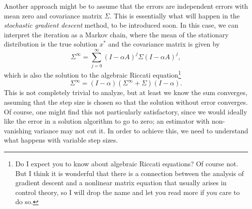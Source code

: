 \documentclass[12pt, leqno]{article} %
\begin{document}
Another approach might be to assume that the errors are independent
errors with mean zero and covariance matrix $\Sigma$.  This is
essentially what will happen in the {\em stochastic gradient descent}
method, to be introduced soon.  In this case, we can interpret the iteration
as a Markov chain, where the mean of the stationary distribution is
the true solution $x^*$ and the covariance matrix is given by
\[
  \Sigma^\infty = \sum_{j=0}^\infty (I-\alpha A)^j \Sigma (I-\alpha A)^j,
\]
which is also the solution to the algebraic Riccati equation\footnote{%
Do I expect you to know about algebraic Riccati equations?  Of course
not.  But I think it is wonderful that there is a connection between
the analysis of gradient descent and a nonlinear matrix equation that
usually arises in control theory, so I will drop the name and let you
read more if you care to do so.
}
\[
  \Sigma^\infty = (I-\alpha) (\Sigma^\infty + \Sigma) (I-\alpha).
\]
This is not completely trivial to analyze, but at least we know the
sum converges, assuming that the step size is chosen so that the
solution without error converges.
Of course, one might find this not particularly satisfactory, since
we would ideally like the error in a solution algorithm to go to zero;
an estimator with non-vanishing variance may not cut it.  In order to
achieve this, we need to understand what happens with variable
step sizes.



\end{document}
